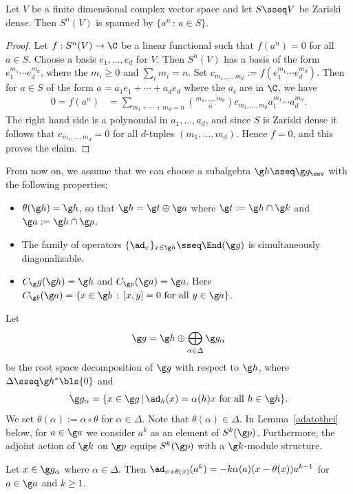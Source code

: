 \documentclass[11pt]{amsart}
\begin{document}
\begin{lem}\label{Zariski-dense}
Let $V$ be a finite dimensional complex vector space and let $S\sseq V$ be Zariski dense. Then $S^n(V)$ is spanned by $\{a^n\,:\,a\in S\}$.
\end{lem}
\begin{proof}
Let $f:S^n(V)\to\C$ be a linear functional such that $f(a^n)=0$ for all $a\in S$. Choose a basis $e_1,\ldots,e_d$ for $V$. Then  $S^n(V)$ has a basis of the form $e_1^{m_1}\cdots e_d^{m_d}$, where the $m_i\geq 0$ and $\sum_i m_i=n$. 
Set $c_{m_1,\ldots,m_d}:=f(e_1^{m_1}\cdots e_d^{m_d})$. Then for $a\in S$ of the form $a=a_1e_1+\cdots+a_de_d$ where the $a_i$ are in $\C$, we have
\begin{align*}
	0=f(a^n)&=
	\sum_{m_1+\cdots +m_d=n}
	{m_1,\ldots,m_d \choose n}c_{m_1,\ldots,m_d}
	a_1^{m_1}\cdots a_d^{m_d}.
	\end{align*}
The right hand side is a polynomial in $a_1,\ldots,a_d$, and since $S$ is Zariski dense it follows that $c_{m_1,\ldots,m_d}=0$ for all $d$-tuples $(m_1,\ldots,m_d)$. 
	Hence $f=0$, and this proves the claim. 
\end{proof}
From now on, we assume that we can  choose a subalgebra $\g h\sseq \g g_\eev$ with the following properties:
\begin{itemize}
\item[(i)] $\theta(\g h)=\g h$, so that 
$\g h=\g t\oplus\g a$ where $\g t:=\g h\cap\g k$ and $\g a:=\g h\cap\g p$. 
\item[(ii)] The family of operators $\{\ad_x\}_{x\in\g h}\sseq\End(\g g)$ is simultaneously diagonalizable. 


\item[(iii)] $C_\g  g(\g h)=\g h$ and $C_{\g p}(\g a)=\g a$. Here  $C_{\g b}(\g a)=\{x\in\g b\,:\,[x,y]=0\text{ for all }y\in\g a\}$.

\end{itemize}
Let \[
\g g=\g h\oplus\bigoplus_{\alpha\in \Delta}\g g_\alpha
\] be the root space decomposition of $\g g$ with respect to  $\g h$, where $\Delta\sseq \g h^*\bls\{0\}$ and
\[
\g g_{\alpha}=\lbrace x\in \g g \,|\,{\ad}_{h}(x)=\alpha(h)x\text{ for all }h\in \g h \rbrace.
\]
We set $\theta(\alpha):=\alpha\circ\theta$ for $\alpha\in\Delta$. Note that $\theta(\alpha)\in\Delta$. 
In Lemma~\ref{adatothei} below, for $a\in\g a$ we consider $a^k$ as an element of $S^k(\g p)$. Furthermore, the adjoint action of $\g k$ on $\g p$ equips  $S^k(\g p)$ with a $\g k$-module structure. 
\begin{lem}\label{adatothei}
Let $x\in \g g_{\alpha}$ where $\alpha\in \Delta$. Then $
	\ad_{x+\theta(x)}(a^k)
	=-k\alpha(a)(x-\theta(x))a^{k-1}$ for $a\in\g a$ and $k\geq 1$. 
\end{lem}
\end{document}
